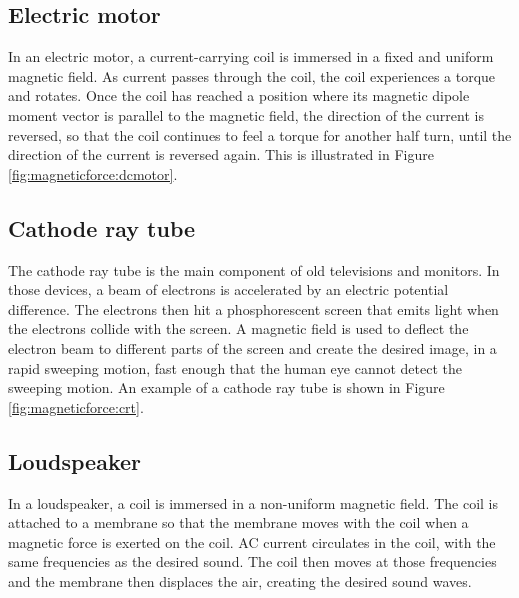 \subsection{Electric motor}
In an electric motor, a current-carrying coil is immersed in a fixed and uniform magnetic field. As current passes through the coil, the coil experiences a torque and rotates. Once the coil has reached a position where its magnetic dipole moment vector is parallel to the magnetic field, the direction of the current is reversed, so that the coil continues to feel a torque for another half turn, until the direction of the current is reversed again. This is illustrated in Figure \ref{fig:magneticforce:dcmotor}.


\subsection{Cathode ray tube}
The cathode ray tube is the main component of old televisions and monitors. In those devices, a beam of electrons is accelerated by an electric potential difference. The electrons then hit a phosphorescent screen that emits light when the electrons collide with the screen. A magnetic field is used to deflect the electron beam to different parts of the screen and create the desired image, in a rapid sweeping motion, fast enough that the human eye cannot detect the sweeping motion. An example of a cathode ray tube is shown in Figure \ref{fig:magneticforce:crt}.


\subsection{Loudspeaker}
In a loudspeaker, a coil is immersed in a non-uniform magnetic field. The coil is attached to a membrane so that the membrane moves with the coil when a magnetic force is exerted on the coil. AC current circulates in the coil, with the same frequencies as the desired sound. The coil then moves at those frequencies and the membrane then displaces the air, creating the desired sound waves.

